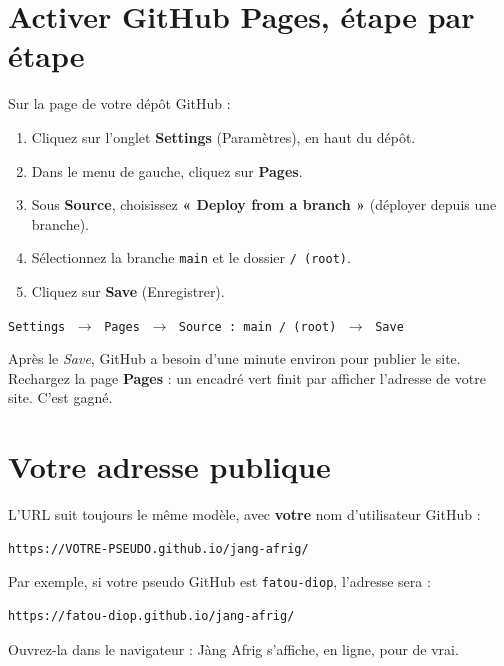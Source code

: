 \documentclass[11pt,a4paper]{article}
\newcommand{\code}[1]{\texttt{#1}}
\begin{document}
\section{Activer GitHub Pages, étape par étape}

Sur la page de votre dépôt GitHub :
\begin{enumerate}[leftmargin=*]
  \item Cliquez sur l'onglet \textbf{Settings} (Paramètres), en haut du dépôt.
  \item Dans le menu de gauche, cliquez sur \textbf{Pages}.
  \item Sous \textbf{Source}, choisissez \textbf{« Deploy from a branch »} (déployer depuis une branche).
  \item Sélectionnez la branche \code{main} et le dossier \code{/ (root)}.
  \item Cliquez sur \textbf{Save} (Enregistrer).
\end{enumerate}

\begin{center}
\code{Settings} $\;\rightarrow\;$ \code{Pages} $\;\rightarrow\;$ \code{Source : main / (root)} $\;\rightarrow\;$ \code{Save}
\end{center}

\begin{infobox}
Après le \emph{Save}, GitHub a besoin d'une minute environ pour publier le site. Rechargez la page \textbf{Pages} : un encadré vert finit par afficher l'adresse de votre site. C'est gagné.
\end{infobox}

\section{Votre adresse publique}

L'URL suit toujours le même modèle, avec \textbf{votre} nom d'utilisateur GitHub :

\begin{lstlisting}[style=html]
https://VOTRE-PSEUDO.github.io/jang-afrig/
\end{lstlisting}

Par exemple, si votre pseudo GitHub est \code{fatou-diop}, l'adresse sera :
\begin{lstlisting}[style=html]
https://fatou-diop.github.io/jang-afrig/
\end{lstlisting}
Ouvrez-la dans le navigateur : Jàng Afrig s'affiche, en ligne, pour de vrai.
\end{document}

